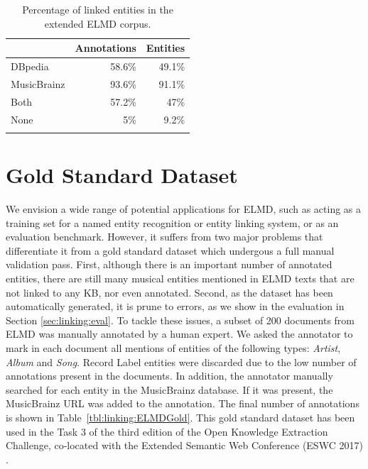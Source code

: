 \begin{table}[]
\centering
\begin{tabular}{| l| r |r |}
\hline
& \textbf{Annotations} & \textbf{Entities} \\ \hline
DBpedia    & 58.6\%      & 49.1\%    \\ \hline
MusicBrainz & 93.6\%      & 91.1\%    \\ \hline
Both  & 57.2\%       & 47\%    \\ \hline
None & 5\%	& 9.2\% \\ \hline
\\ \hline
\end{tabular}
\caption{Percentage of linked entities in the extended ELMD corpus.}
\label{tbl:linking:elmd2_percentage}
\end{table}


\section{Gold Standard Dataset}
\label{sec:linking:gold}

We envision a wide range of potential applications for \textsc{ELMD}, such as acting as a training set for a named entity recognition or entity linking system, or as an evaluation benchmark. However, it suffers from two major problems that differentiate it from a gold standard dataset which undergous a full manual validation pass. First, although there is an important number of annotated entities, there are still many musical entities mentioned in \textsc{ELMD} texts that are not linked to any KB, nor even annotated. Second, as the dataset has been automatically generated, it is prune to errors, as we show in the evaluation in Section \ref{sec:linking:eval}. To tackle these issues, a subset of 200 documents from \textsc{ELMD} was manually annotated by a human expert. We asked the annotator to mark in each document all mentions of entities of the following types: \textit{Artist}, \textit{Album} and \textit{Song}. Record Label entities were discarded due to the low number of annotations present in the documents. In addition, the annotator manually searched for each entity in the MusicBrainz database. If it was present, the MusicBrainz URL was added to the annotation. The final number of annotations is shown in Table~\ref{tbl:linking:ELMDGold}.
This gold standard dataset has been used in the Task 3 of the third edition of the Open Knowledge Extraction Challenge, co-located with the Extended Semantic Web Conference (ESWC 2017) \citep{}.

